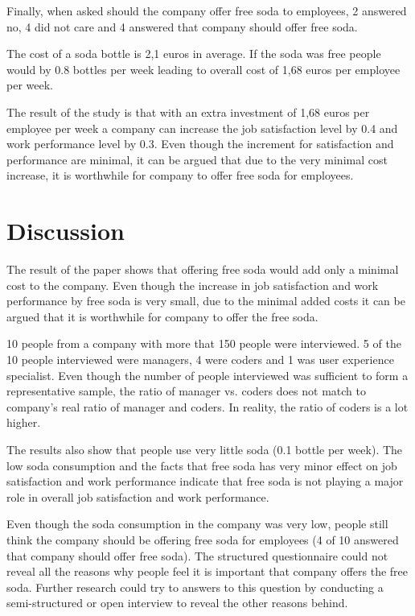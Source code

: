 \documentclass[a4paper]{article}
\begin{document}
Finally, when asked should the company offer free soda to employees, 2 answered no, 4 did not care and 4 answered that company should offer free soda.

The cost of a soda bottle is 2,1 euros in average. If the soda was free people would by 0.8 bottles per week leading to overall cost of 1,68 euros per employee per week.

The result of the study is that with an extra investment of 1,68 euros per employee per week a company can increase the job satisfaction level by 0.4 and work performance level by 0.3. Even though the increment for satisfaction and performance are minimal, it can be argued that due to the very minimal cost increase, it is worthwhile for company to offer free soda for employees.

\begin{comment}
What is the answer to the research question? 
What are the answers to the sub-questions? 
Keep this simple and clear.
\end{comment}

\section{Discussion}

The result of the paper shows that offering free soda would add only a minimal cost to the company. Even though the increase in job satisfaction and work performance by free soda is very small, due to the minimal added costs it can be argued that it is worthwhile for company to offer the free soda.

10 people from a company with more that 150 people were interviewed. 5 of the 10 people interviewed were managers, 4 were coders and 1 was user experience specialist. Even though the number of people interviewed was sufficient to form a representative sample, the ratio of manager vs. coders does not match to company's real ratio of manager and coders. In reality, the ratio of coders is a lot higher.

The results also show that people use very little soda (0.1 bottle per week). The low soda consumption and the facts that free soda has very minor effect on job satisfaction and work performance indicate that free soda is not playing a major role in overall job satisfaction and work performance.

Even though the soda consumption in the company was very low, people still think the company should be offering free soda for employees (4 of 10 answered that company should offer free soda). The structured questionnaire could not reveal all the reasons why people feel it is important that company offers the free soda. Further research could try to answers to this question by conducting a semi-structured or open interview to reveal the other reasons behind.
\end{document}
